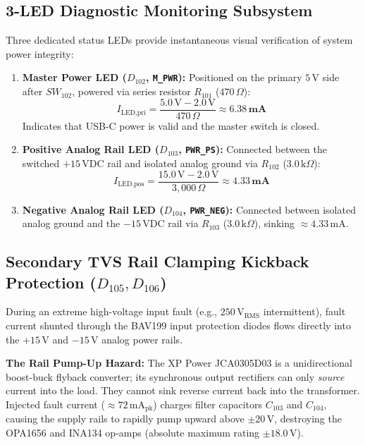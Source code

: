 \documentclass[11pt, letterpaper]{article}
\begin{document}
\subsection{3-LED Diagnostic Monitoring Subsystem}
Three dedicated status LEDs provide instantaneous visual verification of system power integrity:
\begin{enumerate}[label=\textbf{\arabic*.}]
    \item \textbf{Master Power LED ($D_{102}$, \texttt{M\_PWR}):} Positioned on the primary $5\,\text{V}$ side after $SW_{102}$, powered via series resistor $R_{101}$ ($470\,\Omega$):
    \begin{equation}
        I_{\text{LED,pri}} = \frac{5.0\,\text{V} - 2.0\,\text{V}}{470\,\Omega} \approx \mathbf{6.38\,\text{mA}}
    \end{equation}
    Indicates that USB-C power is valid and the master switch is closed.
    \item \textbf{Positive Analog Rail LED ($D_{103}$, \texttt{PWR\_PS}):} Connected between the switched $+15\,\text{VDC}$ rail and isolated analog ground via $R_{102}$ ($3.0\,\text{k}\Omega$):
    \begin{equation}
        I_{\text{LED,pos}} = \frac{15.0\,\text{V} - 2.0\,\text{V}}{3{,}000\,\Omega} \approx \mathbf{4.33\,\text{mA}}
    \end{equation}
    \item \textbf{Negative Analog Rail LED ($D_{104}$, \texttt{PWR\_NEG}):} Connected between isolated analog ground and the $-15\,\text{VDC}$ rail via $R_{103}$ ($3.0\,\text{k}\Omega$), sinking $\approx 4.33\,\text{mA}$.
\end{enumerate}

\subsection{Secondary TVS Rail Clamping Kickback Protection \texorpdfstring{($D_{105}, D_{106}$)}{(D105, D106)}}
During an extreme high-voltage input fault (e.g., $250\,\text{V}_{\text{RMS}}$ intermittent), fault current shunted through the BAV199 input protection diodes flows directly into the $+15\,\text{V}$ and $-15\,\text{V}$ analog power rails. 

\textbf{The Rail Pump-Up Hazard:} The XP Power JCA0305D03 is a unidirectional boost-buck flyback converter; its synchronous output rectifiers can only \textit{source} current into the load. They cannot sink reverse current back into the transformer. Injected fault current ($\approx 72\,\text{mA}_{\text{pk}}$) charges filter capacitors $C_{103}$ and $C_{104}$, causing the supply rails to rapidly pump upward above $\pm 20\,\text{V}$, destroying the OPA1656 and INA134 op-amps (absolute maximum rating $\pm 18.0\,\text{V}$).
\end{document}
